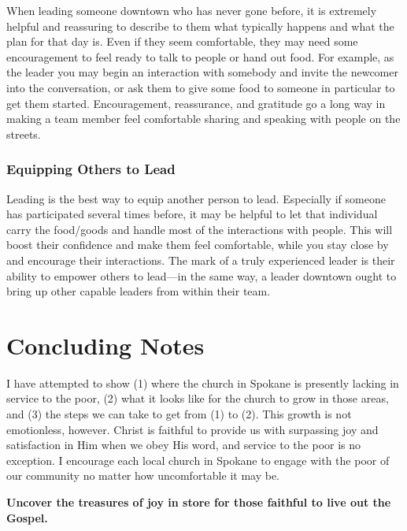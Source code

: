 \documentclass[12pt]{article}
\begin{document}
    When leading someone downtown who has never gone before, it is extremely helpful and reassuring to describe to them what typically happens and what the plan for that day is.
    Even if they seem comfortable, they may need some encouragement to feel ready to talk to people or hand out food.
    For example, as the leader you may begin an interaction with somebody and invite the newcomer into the conversation, or ask them to give some food to someone in particular to get them started.
    Encouragement, reassurance, and gratitude go a long way in making a team member feel comfortable sharing and speaking with people on the streets.

\subsubsection{Equipping Others to Lead}

    Leading is the best way to equip another person to lead.
    Especially if someone has participated several times before, it may be helpful to let that individual carry the food/goods and handle most of the interactions with people.
    This will boost their confidence and make them feel comfortable, while you stay close by and encourage their interactions.
    The mark of a truly experienced leader is their ability to empower others to lead---in the same way, a leader downtown ought to bring up other capable leaders from within their team.

\section{Concluding Notes}

    \qChristianHedonism
    I have attempted to show (1) where the church in Spokane is presently lacking in service to the poor, (2) what it looks like for the church to grow in those areas, and (3) the steps we can take to get from (1) to (2).
    This growth is not emotionless, however.
    Christ is faithful to provide us with surpassing joy and satisfaction in Him when we obey His word, and service to the poor is no exception.
    I encourage each local church in Spokane to engage with the poor of our community no matter how uncomfortable it may be.
    \par \textbf{Uncover the treasures of joy in store for those faithful to live out the Gospel.}
    \qJohnEdwardsJoy

{}

\end{document}
